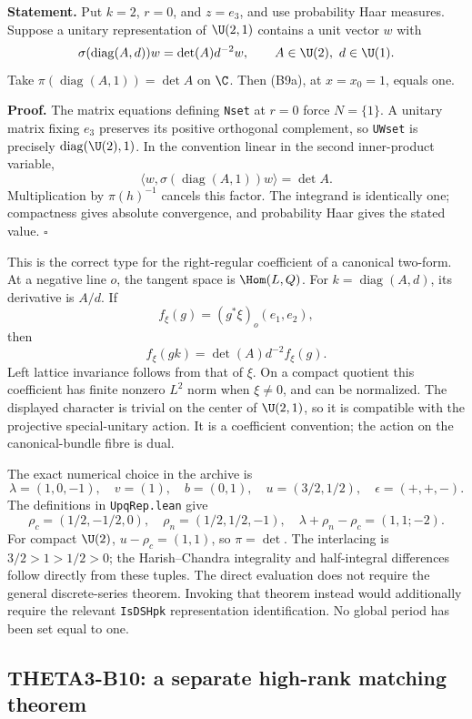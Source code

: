 \textbf{Statement.} Put $k=2$, $r=0$, and $z=e_3$, and use probability Haar measures. Suppose a unitary representation of $\U(2,1)$ contains a unit vector $w$ with
\[
 \sigma(\operatorname{diag}(A,d))w=\det(A)d^{-2}w,
 \qquad A\in\U(2),\ d\in\U(1).
\]
Take $\pi(\operatorname{diag}(A,1))=\det A$ on $\C$. Then (B9a), at $x=x_0=1$, equals one.

\textbf{Proof.} The matrix equations defining \texttt{Nset} at $r=0$ force $N=\{1\}$. A unitary matrix fixing $e_3$ preserves its positive orthogonal complement, so \texttt{UWset} is precisely $\operatorname{diag}(\U(2),1)$. In the convention linear in the second inner-product variable,
\[
 \langle w,\sigma(\operatorname{diag}(A,1))w\rangle=\det A.
\]
Multiplication by $\pi(h)^{-1}$ cancels this factor. The integrand is identically one; compactness gives absolute convergence, and probability Haar gives the stated value. \hfill$\square$

This is the correct type for the right-regular coefficient of a canonical two-form. At a negative line $o$, the tangent space is $\Hom(L,Q)$. For $k=\operatorname{diag}(A,d)$, its derivative is $A/d$. If
\[
 f_\xi(g)=(g^*\xi)_o(e_1,e_2),
\]
then
\[
 f_\xi(gk)=\det(A)d^{-2}f_\xi(g).
\]
Left lattice invariance follows from that of $\xi$. On a compact quotient this coefficient has finite nonzero $L^2$ norm when $\xi\ne0$, and can be normalized. The displayed character is trivial on the center of $\U(2,1)$, so it is compatible with the projective special-unitary action. It is a coefficient convention; the action on the canonical-bundle fibre is dual.

The exact numerical choice in the archive is
\[
 \lambda=(1,0,-1),\quad v=(1),\quad b=(0,1),\quad
 u=(3/2,1/2),\quad\epsilon=(+,+,-).
\]
The definitions in \texttt{UpqRep.lean} give
\[
 \rho_c=(1/2,-1/2,0),\quad\rho_n=(1/2,1/2,-1),\quad
 \lambda+\rho_n-\rho_c=(1,1;-2).
\]
For compact $\U(2)$, $u-\rho_c=(1,1)$, so $\pi=\det$. The interlacing is
$3/2>1>1/2>0$; the Harish--Chandra integrality and half-integral differences follow directly from these tuples. The direct evaluation does not require the general discrete-series theorem. Invoking that theorem instead would additionally require the relevant \texttt{IsDSHpk} representation identification. No global period has been set equal to one.

\subsection{THETA3-B10: a separate high-rank matching theorem}\label{B10}

